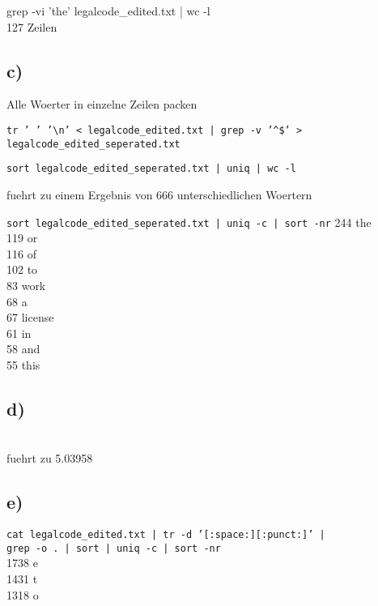 \documentclass[a4paper,12pt]{article}
\begin{document}
grep -vi 'the' legalcode\_edited.txt | wc -l \\
127 Zeilen

\subsection*{c)}
Alle Woerter in einzelne Zeilen packen

\texttt{tr ' ' '\textbackslash{}n' < legalcode\_edited.txt | grep -v '\textasciicircum{}\$' > legalcode\_edited\_seperated.txt}

\texttt{sort legalcode\_edited\_seperated.txt | uniq | wc -l} 

fuehrt zu einem Ergebnis von 666 unterschiedlichen Woertern

\texttt{sort legalcode\_edited\_seperated.txt | uniq -c | sort -nr}
244 the \\
119 or \\
116 of\\
102 to \\
83 work \\
68 a \\
67 license \\
61 in \\
58 and \\
55 this \\

\subsection*{d)}
\texttt{} \\
fuehrt zu 5.03958

\subsection*{e)}
\texttt{cat legalcode\_edited.txt | tr -d '[:space:][:punct:]' | \\
grep -o . | sort | uniq -c | sort -nr} \\
1738 e\\
1431 t\\
1318 o\\
\end{document}
